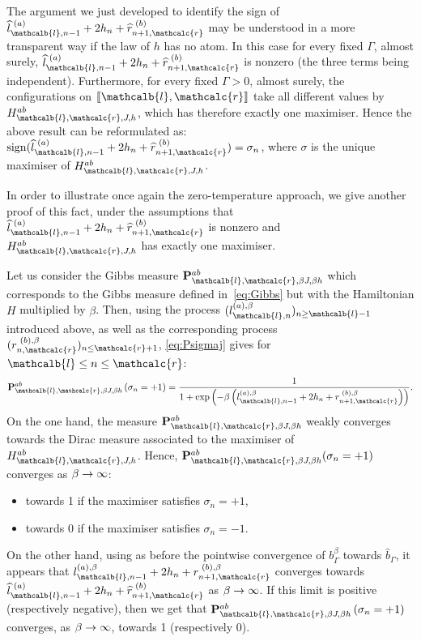 \documentclass[AHL,Unicode,longabstracts,published]{cedram}
\newcommand{\bP}{\mathbf{P}}
\newcommand{\gb}{\beta}
\newcommand{\gG}{\Gamma}
\newcommand{\gs}{\sigma}
\newcommand{\ls}{\widehat{l}}
\newcommand{\rs}{\widehat{r}}
\DeclareMathOperator{\sign}{\mathrm{sign}}
\renewcommand{\ell}{\mathcalb{l}}
\newcommand{\err}{\mathcalc{r}}
\newcommand{\llbracket}{\mathopen{[\mkern -2.7mu[}}
\newcommand{\rrbracket}{\mathclose{]\mkern -2.7mu]}}
\newcommand{\lbra}{\llbracket}
\newcommand{\rbra}{\rrbracket}
\renewcommand*{\to}{\mathchoice{\longrightarrow}{\rightarrow}{\rightarrow}{\rightarrow}}
\begin{document}
\begin{rema}
The argument we just developed to identify the sign of $ \ls_{\ell, n-1}^{\,\,(a)}+2 h_n + \rs_{n+1, \err}^{\,\, (b)}$ may be understood in a more transparent way if the law of $h$ has no atom. In this case for every fixed $\gG$, almost surely, $\ls_{\ell, n-1}^{\,\,(a)}+2 h_n + \rs_{n+1, \err}^{\,\,(b)}$ is nonzero (the three terms being independent). Furthermore, for every fixed $\gG>0$, almost surely, the configurations on $\lbra\ell, \err\rbra$ take all different values by $H_{\ell, \err, J, h}^{ab}$, which has therefore exactly one maximiser. Hence the above result can be reformulated as: $\sign(\ls_{\ell, n-1}^{\,\,(a)}+2 h_n + \rs_{n+1, \err}^{\,\,(b)})=\sigma_n$, where $\sigma$ is the unique maximiser of $H_{\ell, \err, J, h}^{ab}$.

In order to illustrate once again the zero-temperature approach, we give another proof of this fact, under the assumptions that $\ls_{\ell, n-1}^{\,\,(a)}+2 h_n + \rs_{n+1, \err}^{\,\,(b)}$ is nonzero and $H_{\ell, \err, J, h}^{ab}$ has exactly one maximiser.

Let us consider the Gibbs measure $\bP_{\ell, \err, \beta J, \beta h}^{ab}$ which corresponds to the Gibbs measure defined in~\eqref{eq:Gibbs} but with the Hamiltonian $H$ multiplied by $\beta$. Then, using the process $(l_{\ell, n}^{(a), \beta})_{n\ge \ell-1}$ introduced above, as well as the corresponding process $(r_{n,\err}^{\,\,(b), \beta})_{n\le \err+1}$, \eqref{eq:Psigmaj} gives for $\ell\le n\le \err$:
\begin{equation}\label{eq:Psigmajbeta}
\bP_{\ell, \err, \beta J, \beta h}^{ab}\left(\gs_n=+1\right)=
\frac 1 {1+ \exp\left(-\gb\left(l_{\ell,n-1}^{(a),\gb} +2h_n+ r_{n+1, \err}^{\,\,(b),\gb}\right)\right)}.
\end{equation}
On the one hand, the measure $\bP_{\ell, \err, \beta J, \beta h}^{ab}$ weakly converges towards the Dirac measure associated to the maximiser of $H_{\ell, \err, J, h}^{ab}$. Hence, $\bP_{\ell, \err, \beta J, \beta h}^{ab}(\gs_n=+1)$ converges as $\beta\to\infty$:
\begin{itemize}
\item towards 1 if the maximiser satisfies $\sigma_n=+1$,
\item towards 0 if the maximiser satisfies $\sigma_n=-1$.
\end{itemize}
On the other hand, using as before the pointwise convergence of $b_{\gG}^{\beta}$ towards $\widehat{b}_\gG$, it appears that $l_{\ell,n-1}^{(a),\gb} +2h_n+ r_{n+1, \err}^{\,\,(b),\gb}$ converges towards $\ls_{\ell, n-1}^{\,\,(a)}+2 h_n + \rs_{n+1, \err}^{\,\,(b)}$ as $\beta\to \infty$. If this limit is positive (respectively negative), then we get that $\bP_{\ell, \err, \beta J, \beta h}^{ab}\left(\gs_n=+1\right)$ converges, as $\beta\to\infty$, towards 1 (respectively 0).
\end{rema}
\end{document}
